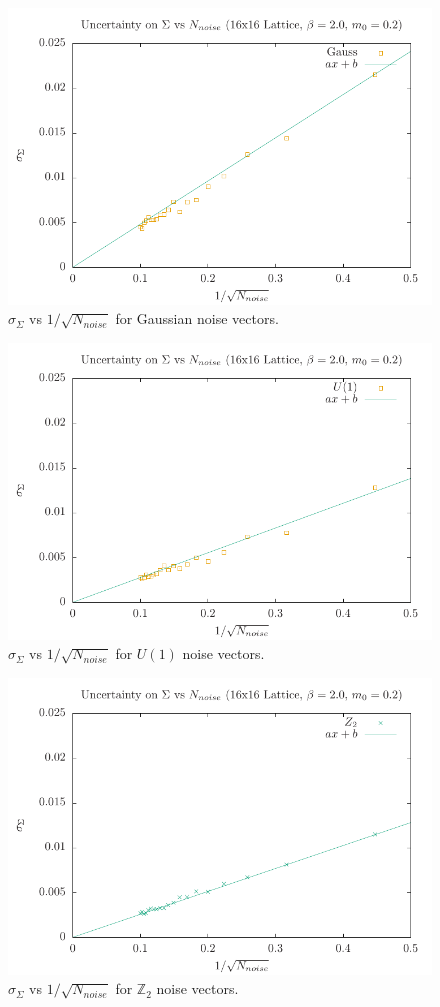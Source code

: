 \begin{figure}[H]
    \centering
    \includegraphics[width=0.8\linewidth]{images/dev_g.pdf}
    \caption{$\sigma_\Sigma$ vs $1/\sqrt{N_{noise}}$ for Gaussian noise vectors.}
    \label{fig:dev_g}
\end{figure}
\begin{figure}[H]
    \centering
    \includegraphics[width=0.8\linewidth]{images/dev_u1.pdf}
    \caption{$\sigma_\Sigma$ vs $1/\sqrt{N_{noise}}$ for $U(1)$ noise vectors.}
    \label{fig:dev_u1}
\end{figure}
\begin{figure}[H]
    \centering
    \includegraphics[width=0.8\linewidth]{images/dev_z2.pdf}
    \caption{$\sigma_\Sigma$ vs $1/\sqrt{N_{noise}}$ for $\mathbb{Z}_2$ noise vectors.}
    \label{fig:dev_z2}
\end{figure}
